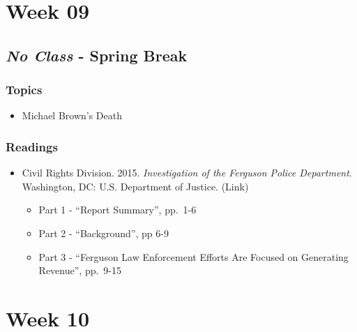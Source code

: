 \documentclass[]{book}
\providecommand{\tightlist}{%
  \setlength{\itemsep}{0pt}\setlength{\parskip}{0pt}}
\begin{document}
\hypertarget{week-09}{%
\section*{Week 09}\label{week-09}}

\hypertarget{no-class---spring-break}{%
\subsection*{\texorpdfstring{\emph{No Class} - Spring Break}{No Class - Spring Break}}\label{no-class---spring-break}}

\hypertarget{topics-16}{%
\subsubsection*{Topics}\label{topics-16}}

\begin{itemize}
\tightlist
\item
  Michael Brown's Death
\end{itemize}

\hypertarget{readings-15}{%
\subsubsection*{Readings}\label{readings-15}}

\begin{itemize}
\tightlist
\item
  Civil Rights Division. 2015. \emph{Investigation of the Ferguson Police Department}. Washington, DC: U.S. Department of Justice. (Link)

  \begin{itemize}
  \tightlist
  \item
    Part 1 - ``Report Summary'', pp.~1-6
  \item
    Part 2 - ``Background'', pp 6-9
  \item
    Part 3 - ``Ferguson Law Enforcement Efforts Are Focused on Generating Revenue'', pp.~9-15
  \end{itemize}
\end{itemize}

\hypertarget{week-10}{%
\section*{Week 10}\label{week-10}}
\end{document}
